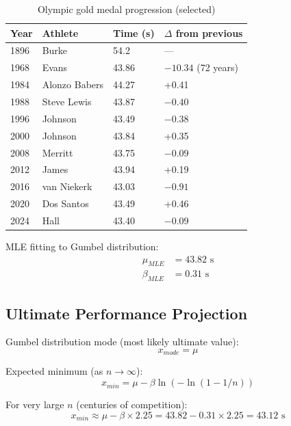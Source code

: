 \begin{table}[H]
\centering
\caption{Olympic gold medal progression (selected)}
\begin{tabular}{@{}llll@{}}
\toprule
\textbf{Year} & \textbf{Athlete} & \textbf{Time (s)} & \textbf{$\Delta$ from previous} \\
\midrule
1896 & Burke & 54.2 & — \\
1968 & Evans & 43.86 & $-10.34$ (72 years) \\
1984 & Alonzo Babers & 44.27 & +0.41 \\
1988 & Steve Lewis & 43.87 & $-0.40$ \\
1996 & Johnson & 43.49 & $-0.38$ \\
2000 & Johnson & 43.84 & +0.35 \\
2008 & Merritt & 43.75 & $-0.09$ \\
2012 & James & 43.94 & +0.19 \\
2016 & van Niekerk & 43.03 & $-0.91$ \\
2020 & Dos Santos & 43.49 & +0.46 \\
2024 & Hall & 43.40 & $-0.09$ \\
\bottomrule
\end{tabular}
\end{table}

MLE fitting to Gumbel distribution:
\begin{align}
\mu_{MLE} &= 43.82 \text{ s} \\
\beta_{MLE} &= 0.31 \text{ s}
\end{align}

\subsection{Ultimate Performance Projection}

Gumbel distribution mode (most likely ultimate value):
\begin{equation}
x_{mode} = \mu
\end{equation}

Expected minimum (as $n \to \infty$):
\begin{equation}
x_{min} = \mu - \beta \ln(-\ln(1 - 1/n))
\end{equation}

For very large $n$ (centuries of competition):
\begin{equation}
x_{min} \approx \mu - \beta \times 2.25 = 43.82 - 0.31 \times 2.25 = 43.12 \text{ s}
\end{equation}

